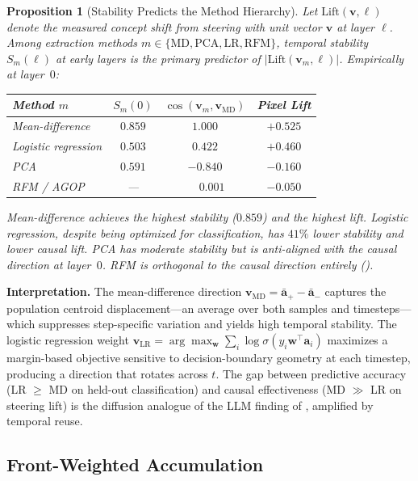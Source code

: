 \documentclass{article}
\newtheorem{proposition}[theorem]{Proposition}
\theoremstyle{definition}
\newcommand{\ba}{\mathbf{a}}
\newcommand{\bv}{\mathbf{v}}
\begin{document}
\begin{proposition}[Stability Predicts the Method Hierarchy]
\label{prop:stability}
Let $\mathrm{Lift}(\bv, \ell)$ denote the measured concept shift from steering with unit vector $\bv$ at layer $\ell$.
Among extraction methods $m \in \{\mathrm{MD}, \mathrm{PCA}, \mathrm{LR}, \mathrm{RFM}\}$, temporal stability $S_m(\ell)$ at early layers is the primary predictor of $|\mathrm{Lift}(\bv_m, \ell)|$.
Empirically at layer~$0$:
\begin{center}
\small
\begin{tabular}{lccc}
\toprule
Method $m$ & $S_m(0)$ & $\cos(\bv_m, \bv_{\mathrm{MD}})$ & Pixel Lift \\
\midrule
Mean-difference & $0.859$ & $1.000$ & $+0.525$ \\
Logistic regression & $0.503$ & $0.422$ & $+0.460$ \\
PCA & $0.591$ & $-0.840$ & $-0.160$ \\
RFM / AGOP & --- & $\phantom{-}0.001$ & $-0.050$ \\
\bottomrule
\end{tabular}
\end{center}
Mean-difference achieves the highest stability ($0.859$) and the highest lift.
Logistic regression, despite being optimized for classification, has $41\%$ lower stability and lower causal lift.
PCA has moderate stability but is anti-aligned with the causal direction at layer~$0$.
RFM is orthogonal to the causal direction entirely ().
\end{proposition}

\textbf{Interpretation.}
The mean-difference direction $\bv_{\mathrm{MD}} = \bar{\ba}_+ - \bar{\ba}_-$ captures the population centroid displacement---an average over both samples and timesteps---which suppresses step-specific variation and yields high temporal stability.
The logistic regression weight $\bv_{\mathrm{LR}} = \arg\max_{\mathbf{w}} \sum_i \log\sigma(y_i \mathbf{w}^\top \ba_i)$ maximizes a margin-based objective sensitive to decision-boundary geometry at each timestep, producing a direction that rotates across $t$.
The gap between predictive accuracy (LR $\geq$ MD on held-out classification) and causal effectiveness (MD $\gg$ LR on steering lift) is the diffusion analogue of the LLM finding of \citet{marks2024geometry}, amplified by temporal reuse.

\subsection{Front-Weighted Accumulation}
\label{sec:accumulation}
\end{document}

